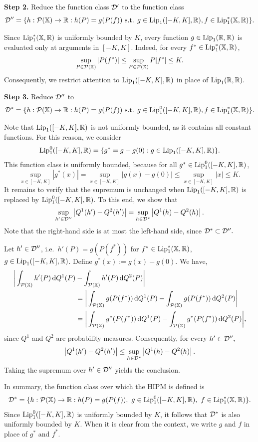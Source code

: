 \textbf{Step 2.} Reduce the function class $\mathcal{D}'$ to the function class
\[
\mathcal{D}'' = \{ h : \mathcal{P}(\mathbb{X}) \to \mathbb{R}: h(P) = g(P(f)) \text{ s.t. } g \in \mathrm{Lip}_1([-K,K],\mathbb{R}), f \in \mathrm{Lip}_1^*(\mathbb{X},\mathbb{R}) \}.
\]

Since $\mathrm{Lip}_1^*(\mathbb{X},\mathbb{R})$ is uniformly bounded by $K$, every function $g \in \mathrm{Lip}_1(\mathbb{R},\mathbb{R})$ is evaluated only at arguments in $[-K,K]$. Indeed, for every $f^* \in \mathrm{Lip}_1^*(\mathbb{X},\mathbb{R})$,
\[
\sup_{P\in\mathcal{P}(\mathbb{X})}|P(f^*)|\leq \sup_{P\in\mathcal{P}(\mathbb{X})}P|f^*|\leq K.
\]
Consequently, we restrict attention to $\mathrm{Lip}_1([-K,K],\mathbb{R})$ in place of $\mathrm{Lip}_1(\mathbb{R},\mathbb{R}).$

\textbf{Step 3.} Reduce $\mathcal{D}''$ to
\[
\mathcal{D}^* = \{ h : \mathcal{P}(\mathbb{X}) \to \mathbb{R} : h(P) = g(P(f)) \text{ s.t. } g \in \mathrm{Lip}_1^0([-K,K],\mathbb{R}), f \in \mathrm{Lip}_1^*(\mathbb{X},\mathbb{R}) \}.
\]


Note that $\mathrm{Lip}_1([-K,K],\mathbb{R})$ is not uniformly bounded, as it contains all constant functions. For this reason, we consider
\[
\mathrm{Lip}_1^0([-K,K],\mathbb{R}) = \{ g^* = g - g(0) : g \in \mathrm{Lip}_1([-K,K],\mathbb{R}) \}.
\]
This function class is uniformly bounded, because for all $g^* \in \mathrm{Lip}_1^0([-K,K],\mathbb{R})$,
\[
\sup_{x\in[-K,K]}|g^*(x)| = \sup_{x\in[-K,K]}|g(x) - g(0)| \leq \sup_{x\in[-K,K]} |x| \leq K.
\]
It remains to verify that the supremum is unchanged when $\mathrm{Lip}_1([-K,K],\mathbb{R})$ is replaced by $\mathrm{Lip}_1^0([-K,K],\mathbb{R}).$ To this end, we show that
\[
\sup_{h' \in \mathcal{D}''} \left|Q^1(h') - Q^2(h')\right|
= \sup_{h \in \mathcal{D}^*} \left|Q^1(h) - Q^2(h)\right|.
\]
Note that the right-hand side is at most the left-hand side, since $\mathcal{D}^* \subset \mathcal{D}''.$

Let $h' \in \mathcal{D}''$, i.e.\ $h'(P) = g(P(f^*))$ for $f^* \in \mathrm{Lip}_1^*(\mathbb{X},\mathbb{R})$, $g \in \mathrm{Lip}_1([-K,K],\mathbb{R})$. Define $g^*(x) := g(x) - g(0)$. We have,
\begin{align*}
    \bigg|\int_{\mathcal{P}(\mathbb{X})} h'(P)\,\mathrm{d}Q^1(P) &- \int_{\mathcal{P}(\mathbb{X})} h'(P)\,\mathrm{d}Q^2(P) \bigg| \\
    & = \bigg|\int_{\mathcal{P}(\mathbb{X})} g(P(f^*))\,\mathrm{d}Q^1(P) - \int_{\mathcal{P}(\mathbb{X})} g(P(f^*))\,\mathrm{d}Q^2(P) \bigg|\\
    & = \bigg|\int_{\mathcal{P}(\mathbb{X})} g^*(P(f^*))\,\mathrm{d}Q^1(P) - \int_{\mathcal{P}(\mathbb{X})} g^*(P(f^*))\,\mathrm{d}Q^2(P)\bigg|,
\end{align*}
since $Q^1$ and $Q^2$ are probability measures. Consequently, for every $h' \in \mathcal{D}'',$
\[ 
\left| Q^1(h') - Q^2(h')\right|
\leq \sup_{h \in \mathcal{D}^*} \left|Q^1(h) - Q^2(h)\right|.
\]
Taking the supremum over $h' \in \mathcal{D}''$ yields the conclusion.

In summary, the function class over which the HIPM is defined is
\[
\mathcal{D}^* = \{h:\mathcal{P}(\mathbb{X}) \to \mathbb{R} : h(P) = g(P(f)), \ g \in \mathrm{Lip}_1^0([-K,K],\mathbb{R}), \ f \in \mathrm{Lip}_1^*(\mathbb{X},\mathbb{R}) \}.
\] 
Since $\mathrm{Lip}_1^0([-K,K],\mathbb{R})$ is uniformly bounded by $K$, it follows that $\mathcal{D}^*$ is also uniformly bounded by $K$. When it is clear from the context, we write $g$ and $f$ in place of $g^*$ and $f^*$.









